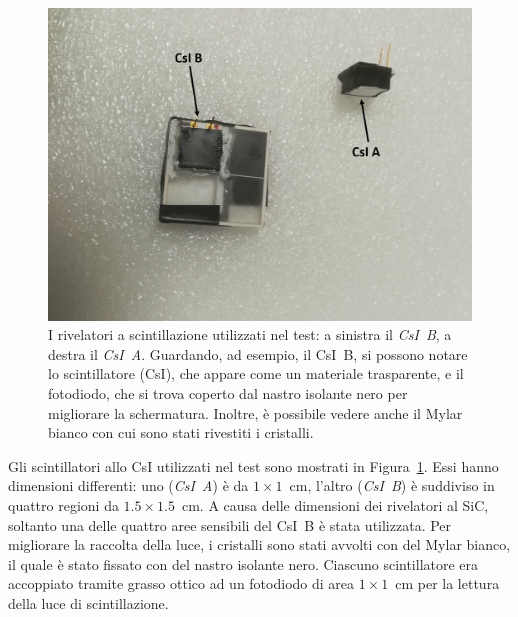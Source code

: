 

\begin{figure} [!t]
	\centering
	\includegraphics[width=\textwidth, keepaspectratio]{Grafici/csi_etichette.png}
	\caption{I rivelatori a scintillazione utilizzati nel test: a sinistra il \emph{CsI~B}, a destra il \emph{CsI~A}. Guardando, ad esempio, il CsI~B, si possono notare lo scintillatore (CsI), che appare come un materiale trasparente, e il fotodiodo, che si trova coperto dal nastro isolante nero per migliorare la schermatura. Inoltre, è possibile vedere anche il Mylar bianco con cui sono stati rivestiti i cristalli.} \label{fig:csi}
\end{figure}



Gli scintillatori allo CsI utilizzati nel test sono mostrati in Figura~\ref{fig:csi}.
Essi hanno dimensioni differenti: uno (\emph{CsI~A}) è da $1 \times 1$~cm, l'altro (\emph{CsI~B}) è suddiviso in quattro regioni da $1.5 \times 1.5$~cm. 
A causa delle dimensioni dei rivelatori al SiC, soltanto una delle quattro aree sensibili del CsI~B è stata utilizzata. Per migliorare la raccolta della luce, i cristalli sono stati avvolti con del Mylar bianco, il quale è stato fissato con del nastro isolante nero.
%
%
Ciascuno scintillatore era accoppiato tramite grasso ottico ad un fotodiodo di area $1 \times 1$~cm per la lettura della luce di scintillazione. 



